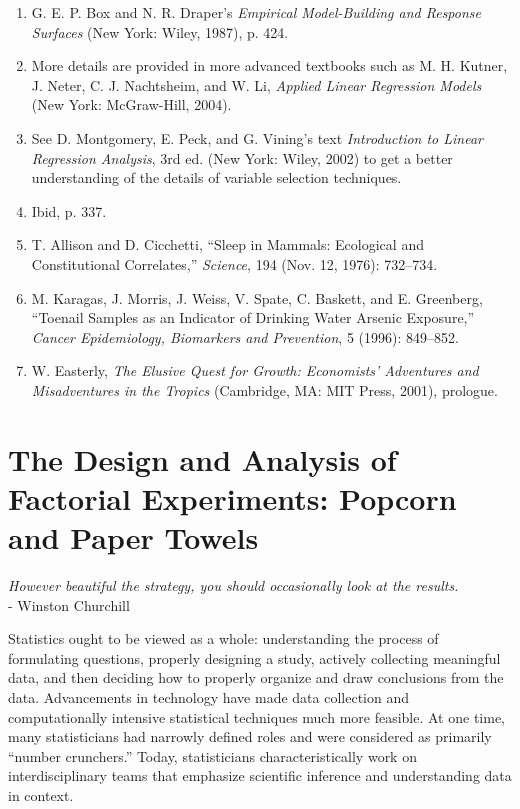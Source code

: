 \documentclass[
]{report}
\begin{document}
\begin{enumerate}
  \item G. E. P. Box and N. R. Draper’s \textit{Empirical Model-Building and Response Surfaces} (New York: Wiley, 1987), p. 424.
   \item More details are provided in more advanced textbooks such as M. H. Kutner, J. Neter, C. J. Nachtsheim, and W. Li, \textit{Applied Linear Regression Models} (New York: McGraw-Hill, 2004).
  \item See D. Montgomery, E. Peck, and G. Vining’s text \textit{Introduction to Linear Regression Analysis}, 3rd ed. (New York: Wiley, 2002) to get a better understanding of the details of variable selection techniques.
  \item Ibid, p. 337.
  \item T. Allison and D. Cicchetti, “Sleep in Mammals: Ecological and Constitutional Correlates,” \textit{Science}, 194 (Nov. 12, 1976): 732–734.
  \item M. Karagas, J. Morris, J. Weiss, V. Spate, C. Baskett, and E. Greenberg, “Toenail Samples as an Indicator of Drinking Water Arsenic Exposure,” \textit{Cancer Epidemiology, Biomarkers and Prevention}, 5 (1996): 849–852.
  \item W. Easterly, \textit{The Elusive Quest for Growth: Economists’ Adventures and Misadventures in the Tropics} (Cambridge, MA: MIT Press, 2001), prologue.
\end{enumerate}

\hypertarget{the-design-and-analysis-of-factorial-experiments-popcorn-and-paper-towels}{%
\chapter{The Design and Analysis of Factorial Experiments: Popcorn and Paper Towels}\label{the-design-and-analysis-of-factorial-experiments-popcorn-and-paper-towels}}

\begin{flushright}
\emph{However beautiful the strategy, you should occasionally look at the results.} \\
- Winston Churchill
\end{flushright}

Statistics ought to be viewed as a whole: understanding the process of formulating questions, properly designing a study, actively collecting meaningful data, and then deciding how to properly organize and draw conclusions from the data. Advancements in technology have made data collection and computationally intensive statistical techniques much more feasible. At one time, many statisticians had narrowly defined roles and were considered as primarily ``number crunchers.'' Today, statisticians characteristically work on interdisciplinary teams that emphasize scientific inference and understanding data in context.
\end{document}
